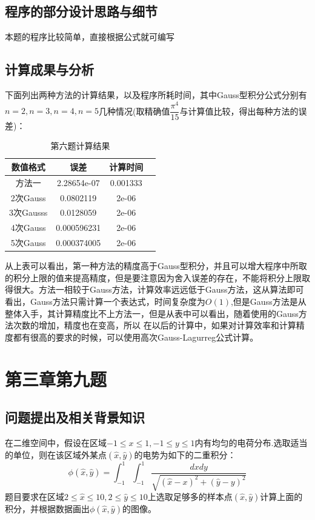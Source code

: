 \documentclass[10pt,a4paper]{ctexart}
\begin{document}
\subsection{程序的部分设计思路与细节}
本题的程序比较简单，直接根据公式就可编写
\subsection{计算成果与分析}
下面列出两种方法的计算结果，以及程序所耗时间，其中Gauss型积分公式分别有$n=2,n=3,n=4,n=5$几种情况(取精确值$\dfrac{\pi^4}{15}$与计算值比较，得出每种方法的误差)：
\begin{center}
\begin{longtable}{|c|c|c|c|}
\caption{第六题计算结果}\\
\hline
数值格式& 误差& 计算时间 \\
\hline
方法一& 2.28654e-07& 0.001333\\
\hline
2次Gauss& 0.0802119& 2e-06\\
\hline
3次Gausss& 0.0128059& 2e-06\\
\hline
4次Gauss& 0.000596231& 2e-06\\
\hline
5次Gauss& 0.000374005& 2e-06\\
\hline
\end{longtable}
\end{center}
从上表可以看出，第一种方法的精度高于Gauss型积分，并且可以增大程序中所取的积分上限的值来提高精度，但是要注意因为舍入误差的存在，不能将积分上限取得很大。方法一相较于Gauss方法，计算效率远远低于Gauss方法，这从算法即可看出，Gauss方法只需计算一个表达式，时间复杂度为$O(1)$,但是Gauss方法是从整体入手，其计算精度比不上方法一，但是从表中可以看出，随着使用的Gauss方法次数的增加，精度也在变高，所以
在以后的计算中，如果对计算效率和计算精度都有很高的要求的时候，可以使用高次Gauss-Lagurreg公式计算。
\section{第三章第九题}
\subsection{问题提出及相关背景知识}
在二维空间中，假设在区域$-1\leq x\leq 1,-1\leq y\leq 1$内有均匀的电荷分布.选取适当的单位，则在该区域外某点$(\widehat{x},\widehat{y})$的电势为如下的二重积分：
\[\phi(\widehat{x},\widehat{y})=\int_{-1}^{1}\int_{-1}^{1}\dfrac{dxdy}{\sqrt{(\widehat{x}-x)^2+(\widehat{y}-y)^2}}\]
题目要求在区域$2\leq \widehat{x}\leq 10,2\leq\widehat{y}\leq 10$上选取足够多的样本点$(\widehat{x},\widehat{y})$计算上面的积分，并根据数据画出$\phi(\widehat{x},\widehat{y})$的图像。
\end{document}
